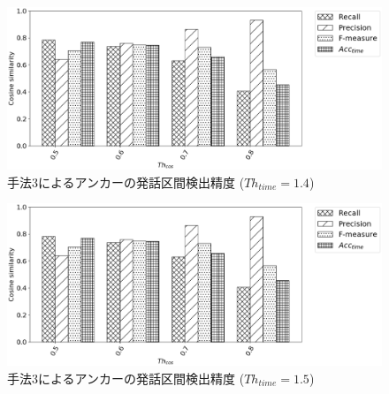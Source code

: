 \begin{figure}[H]
  \begin{center}
    \includegraphics[scale=0.5]{./figure/prob3_14.eps}
  \end{center}
  \caption{手法3によるアンカーの発話区間検出精度 ($Th_{time}=1.4$)}
\end{figure}

\begin{figure}[H]
  \begin{center}
    \includegraphics[scale=0.5]{./figure/prob3_15.eps}
  \end{center}
  \caption{手法3によるアンカーの発話区間検出精度 ($Th_{time}=1.5$)}
\end{figure}
